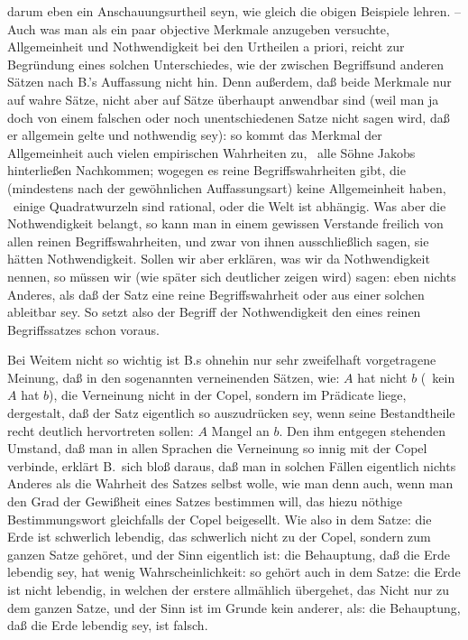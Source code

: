 darum eben ein Anschauungsurtheil seyn, wie gleich die obigen Beispiele lehren. -- Auch was man als ein paar objective Merkmale anzugeben versuchte, Allgemeinheit und Nothwendigkeit bei den Urtheilen a priori, reicht zur Begründung eines solchen Unterschiedes, wie der zwischen Begriffsund anderen Sätzen nach B.'s Auffassung nicht hin. Denn außerdem, daß beide Merkmale nur auf wahre Sätze, nicht aber auf Sätze überhaupt anwendbar sind (weil man ja doch von einem falschen oder noch unentschiedenen Satze nicht sagen wird, daß er allgemein gelte und nothwendig sey): so kommt das Merkmal der Allgemeinheit auch vielen empirischen Wahrheiten zu, \zB\ alle Söhne Jakobs hinterließen Nachkommen; wogegen es reine Begriffswahrheiten gibt, die (mindestens nach der gewöhnlichen Auffassungsart) keine Allgemeinheit haben, \zB\ einige Quadratwurzeln sind rational, oder die Welt ist abhängig. Was aber die Nothwendigkeit belangt, so kann man in einem gewissen Verstande freilich von allen reinen Begriffswahrheiten, und zwar von ihnen ausschließlich sagen, sie hätten Nothwendigkeit. Sollen wir aber erklären, was wir da Nothwendigkeit nennen, so müssen wir (wie später sich deutlicher zeigen wird) sagen: eben nichts Anderes, als daß der Satz eine reine Begriffswahrheit oder aus einer solchen ableitbar sey. So setzt also der Begriff der Nothwendigkeit den eines reinen Begriffssatzes schon voraus. \par
\gliederungslinie\par
Bei Weitem nicht so wichtig ist B.s ohnehin nur sehr zweifelhaft vorgetragene Meinung, daß in den sogenannten verneinenden Sätzen, wie: $A$ hat nicht $b$ (\dh\  kein $A$ hat $b$), die Verneinung nicht in der Copel, sondern im Prädicate liege, dergestalt, daß der Satz eigentlich so auszudrücken sey, wenn seine Bestandtheile recht deutlich hervortreten sollen: $A$  Mangel an $b$. Den ihm entgegen stehenden Umstand, daß man in allen Sprachen die Verneinung so innig mit der Copel verbinde, erklärt B.\ sich bloß daraus, daß man in solchen Fällen eigentlich nichts Anderes als die Wahrheit des Satzes selbst  wolle, wie man denn auch, wenn man den Grad der Gewißheit eines Satzes bestimmen will,  das hiezu nöthige Bestimmungswort gleichfalls der Copel beigesellt. Wie also in dem Satze: die Erde ist schwerlich lebendig, das schwerlich nicht zu der Copel, sondern zum ganzen Satze gehöret, und der Sinn eigentlich ist: die Behauptung, daß die Erde lebendig sey, hat wenig Wahrscheinlichkeit: so gehört auch in dem Satze: die Erde ist nicht lebendig, in welchen der erstere allmählich übergehet, das Nicht nur zu dem ganzen Satze, und der Sinn ist im Grunde kein anderer, als: die Behauptung, daß die Erde lebendig sey, ist falsch. \par
